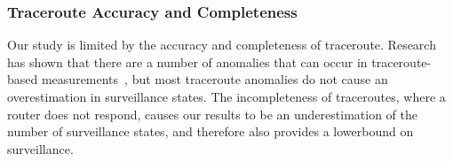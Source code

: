 \subsubsection{Traceroute Accuracy and Completeness}
Our study is limited by the accuracy and completeness of traceroute.  Research has shown that there are a number of anomalies that can occur in traceroute-based measurements~\cite{augustin2006avoiding}, but most traceroute anomalies do not cause an overestimation in surveillance states.  The incompleteness of traceroutes, where a router does not respond, causes our results to be an underestimation of the number of surveillance states, and therefore also provides a lowerbound on surveillance.
